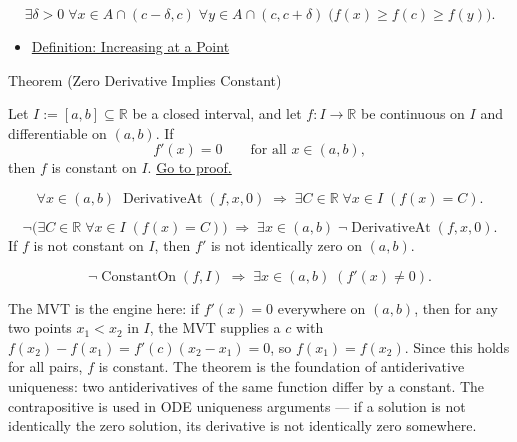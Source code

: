 \begin{remark*}
\[
\exists \delta > 0\;\forall x \in A \cap (c-\delta,c)\;\forall y \in A \cap (c,c+\delta)
\;\bigl(f(x) \geq f(c) \geq f(y)\bigr).
\]
\end{remark*}

\begin{dependencies}
\begin{itemize}
  \item \hyperref[def:increasing-at-a-point]{Definition: Increasing at a Point}
\end{itemize}
\end{dependencies}


\begin{theorembox}{Theorem (Zero Derivative Implies Constant)}
\begin{theorem}
\label{thm:zero-derivative-implies-constant}
Let $I := [a,b] \subseteq \mathbb{R}$ be a closed interval, and let $f : I \to \mathbb{R}$ be continuous on $I$ and differentiable on $(a,b)$. If
\[
f'(x) = 0 \qquad \text{for all } x \in (a,b),
\]
then $f$ is constant on $I$.
\hyperref[prf:zero-derivative-implies-constant]{Go to proof.}
\end{theorem}
\end{theorembox}

\begin{remark*}
\[
\forall x \in (a,b)\;\operatorname{DerivativeAt}(f,x,0)
\;\Rightarrow\;
\exists C \in \mathbb{R}\;\forall x \in I\;(f(x) = C).
\]
\end{remark*}

\begin{remark*}
\[
\lnot\bigl(\exists C \in \mathbb{R}\;\forall x \in I\;(f(x)=C)\bigr)
\;\Rightarrow\;
\exists x \in (a,b)\;\lnot\operatorname{DerivativeAt}(f,x,0).
\]
If $f$ is not constant on $I$, then $f'$ is not identically zero on $(a,b)$.
\end{remark*}

\begin{remark*}
\[
\lnot\operatorname{ConstantOn}(f,I) \;\Rightarrow\; \exists x \in (a,b)\;(f'(x) \neq 0).
\]
\end{remark*}

\begin{remark*}[Interpretation]
The MVT is the engine here: if $f'(x) = 0$ everywhere on $(a,b)$, then for any two points $x_1 < x_2$ in $I$, the MVT supplies a $c$ with $f(x_2)-f(x_1) = f'(c)(x_2-x_1) = 0$, so $f(x_1) = f(x_2)$. Since this holds for all pairs, $f$ is constant. The theorem is the foundation of antiderivative uniqueness: two antiderivatives of the same function differ by a constant. The contrapositive is used in ODE uniqueness arguments --- if a solution is not identically the zero solution, its derivative is not identically zero somewhere.
\end{remark*}

